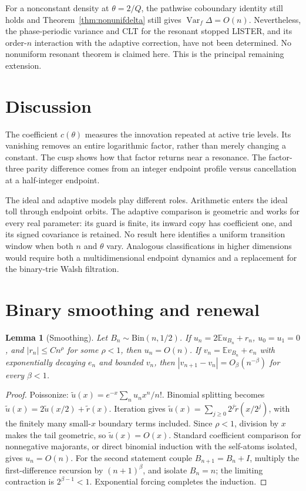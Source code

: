 \documentclass[11pt]{article}
\numberwithin{equation}{section}
\newtheorem{lemma}[theorem]{Lemma}
\theoremstyle{definition}\newtheorem{definition}[theorem]{Definition}
\theoremstyle{remark}\newtheorem{remark}[theorem]{Remark}
\newcommand{\E}{\mathbb E}\newcommand{\Pp}{\mathbb P}
\newcommand{\Var}{\operatorname {Var}}\newcommand{\Cov}{\operatorname {Cov}}
\newcommand{\1}{\mathbf 1}\newcommand{\cD}{\mathcal D}
\begin{document}
For a nonconstant density at $\theta=2/Q$, the pathwise coboundary identity
still holds and Theorem~\ref{thm:nonunifdelta} still gives
$\Var_f\Delta=O(n)$.  Nevertheless, the phase-periodic variance and CLT for
the resonant stopped LISTER, and its order-$n$ interaction with the adaptive
correction, have not been determined.  No nonuniform resonant theorem is
claimed here.  This is the principal remaining extension.

\clearpage
\section{Discussion}
The coefficient $c(\theta)$ measures the innovation repeated at active trie
levels.  Its vanishing removes an entire logarithmic factor, rather than
merely changing a constant.  The cusp shows how that factor returns near a
resonance.  The factor-three parity difference comes from an integer
endpoint profile versus cancellation at a half-integer endpoint.

The ideal and adaptive models play different roles.  Arithmetic enters the
ideal toll through endpoint orbits.  The adaptive comparison is geometric
and works for every real parameter: its guard is finite, its inward copy has
coefficient one, and its signed covariance is retained.  No result here
identifies a uniform transition window when both $n$ and $\theta$ vary.
Analogous classifications in higher dimensions would require both a
multidimensional endpoint dynamics and a replacement for the binary-trie
Walsh filtration.

\appendix
\clearpage
\section{Binary smoothing and renewal}\label{app:smoothing}
\begin{lemma}[Smoothing]\label{lem:smoothing}
Let $B_n\sim\mathrm{Bin}(n,1/2)$.  If
$u_n=2\E u_{B_n}+r_n$, $u_0=u_1=0$, and
$|r_n|\le Cn^\rho$ for some $\rho<1$, then $u_n=O(n)$.  If
$v_n=\E v_{B_n}+e_n$ with exponentially decaying $e_n$ and bounded $v_n$,
then $|v_{n+1}-v_n|=O_\beta(n^{-\beta})$ for every $\beta<1$.
\end{lemma}
\begin{proof}
Poissonize: $\widetilde u(x)=e^{-x}\sum_nu_nx^n/n!$.  Binomial splitting
becomes $\widetilde u(x)=2\widetilde u(x/2)+\widetilde r(x)$.
Iteration gives
$\widetilde u(x)=\sum_{j\ge0}2^j\widetilde r(x/2^j)$, with the finitely many
small-$x$ boundary terms included.  Since $\rho<1$, division by $x$ makes
the tail geometric, so $\widetilde u(x)=O(x)$.  Standard coefficient
comparison for nonnegative majorants, or direct binomial induction with the
self-atoms isolated, gives $u_n=O(n)$.  For the second statement couple
$B_{n+1}=B_n+I$, multiply the first-difference recursion by
$(n+1)^\beta$, and isolate $B_n=n$; the limiting contraction is
$2^{\beta-1}<1$.  Exponential forcing completes the induction.
\end{proof}
\end{document}
